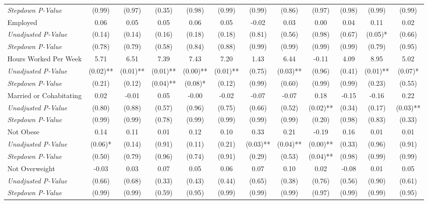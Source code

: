 \begin{tabular}{l c c c c c c c c c c c}
\quad \textit{Stepdown P-Value} & (0.99) & (0.97) & (0.35) & (0.98) & (0.99) & (0.99) & (0.86) & (0.97) & (0.98) & (0.99) & (0.99) \\
Employed & 0.06 & 0.05 & 0.05 & 0.06 & 0.05 & -0.02 & 0.03 & 0.00 & 0.04 & 0.11 & 0.02 \\
\quad \textit{Unadjusted P-Value} & (0.14) & (0.14) & (0.16) & (0.18) & (0.18) & (0.81) & (0.56) & (0.98) & (0.67) & (0.05)* & (0.66) \\
\quad \textit{Stepdown P-Value} & (0.78) & (0.79) & (0.58) & (0.84) & (0.88) & (0.99) & (0.99) & (0.99) & (0.99) & (0.79) & (0.95) \\
Hours Worked Per Week & 5.71 & 6.51 & 7.39 & 7.43 & 7.20 & 1.43 & 6.44 & -0.11 & 4.09 & 8.95 & 5.02 \\
\quad \textit{Unadjusted P-Value} & (0.02)** & (0.01)** & (0.01)** & (0.00)** & (0.01)** & (0.75) & (0.03)** & (0.96) & (0.41) & (0.01)** & (0.07)* \\
\quad \textit{Stepdown P-Value} & (0.21) & (0.12) & (0.04)** & (0.08)* & (0.12) & (0.99) & (0.60) & (0.99) & (0.99) & (0.23) & (0.55) \\
Married or Cohabitating & 0.02 & -0.01 & 0.05 & -0.00 & -0.02 & -0.07 & -0.07 & 0.18 & -0.15 & -0.16 & 0.22 \\
\quad \textit{Unadjusted P-Value} & (0.80) & (0.88) & (0.57) & (0.96) & (0.75) & (0.66) & (0.52) & (0.02)** & (0.34) & (0.17) & (0.03)** \\
\quad \textit{Stepdown P-Value} & (0.99) & (0.99) & (0.78) & (0.99) & (0.99) & (0.99) & (0.99) & (0.20) & (0.98) & (0.83) & (0.33) \\
Not Obese & 0.14 & 0.11 & 0.01 & 0.12 & 0.10 & 0.33 & 0.21 & -0.19 & 0.16 & 0.01 & 0.01 \\
\quad \textit{Unadjusted P-Value} & (0.06)* & (0.14) & (0.91) & (0.11) & (0.21) & (0.03)** & (0.04)** & (0.00)** & (0.33) & (0.96) & (0.91) \\
\quad \textit{Stepdown P-Value} & (0.50) & (0.79) & (0.96) & (0.74) & (0.91) & (0.29) & (0.53) & (0.04)** & (0.98) & (0.99) & (0.99) \\
Not Overweight & -0.03 & 0.03 & 0.07 & 0.05 & 0.06 & 0.07 & 0.10 & 0.02 & -0.08 & 0.01 & 0.05 \\
\quad \textit{Unadjusted P-Value} & (0.66) & (0.68) & (0.33) & (0.43) & (0.44) & (0.65) & (0.38) & (0.76) & (0.56) & (0.90) & (0.61) \\
\quad \textit{Stepdown P-Value} & (0.99) & (0.99) & (0.59) & (0.95) & (0.99) & (0.99) & (0.99) & (0.97) & (0.99) & (0.99) & (0.95) \\

\end{tabular}
